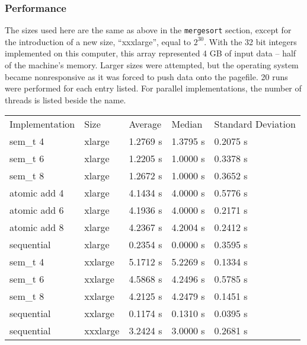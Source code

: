 \documentclass{article}
\begin{document}
\subsubsection{Performance}
The sizes used here are the same as above in the \texttt{mergesort}
section, except for the introduction of a new size, ``xxxlarge'',
equal to $2^{30}$. With the 32 bit integers implemented on this
computer, this array represented 4 GB of input data -- half of the
machine's memory. Larger sizes were attempted, but the operating
system became nonresponsive as it was forced to push data onto the
pagefile. 20 runs were performed for each entry listed. For parallel
implementations, the number of threads is listed beside the name.

\begin{center}
\begin{tabular}{lllll}
 Implementation  &  Size      &  Average   &  Median    &  Standard Deviation  \\
 sem\_t 4        &  xlarge    &  1.2769 s  &  1.3795 s  &  0.2075 s            \\
 sem\_t 6        &  xlarge    &  1.2205 s  &  1.0000 s  &  0.3378 s            \\
 sem\_t 8        &  xlarge    &  1.2672 s  &  1.0000 s  &  0.3652 s            \\
 atomic add 4    &  xlarge    &  4.1434 s  &  4.0000 s  &  0.5776 s            \\
 atomic add 6    &  xlarge    &  4.1936 s  &  4.0000 s  &  0.2171 s            \\
 atomic add 8    &  xlarge    &  4.2367 s  &  4.2004 s  &  0.2412 s            \\
 sequential      &  xlarge    &  0.2354 s  &  0.0000 s  &  0.3595 s            \\
 sem\_t 4        &  xxlarge   &  5.1712 s  &  5.2269 s  &  0.1334 s            \\
 sem\_t 6        &  xxlarge   &  4.5868 s  &  4.2496 s  &  0.5785 s            \\
 sem\_t 8        &  xxlarge   &  4.2125 s  &  4.2479 s  &  0.1451 s            \\
 sequential      &  xxlarge   &  0.1174 s  &  0.1310 s  &  0.0395 s            \\
 sequential      &  xxxlarge  &  3.2424 s  &  3.0000 s  &  0.2681 s            \\
\end{tabular}
\end{center}
\end{document}
